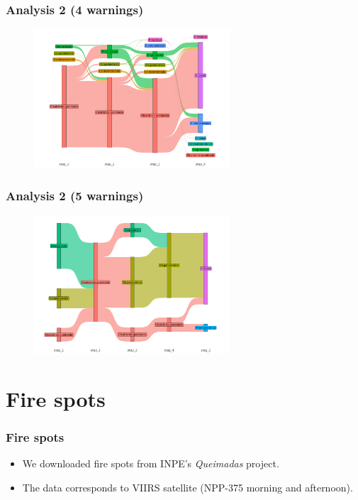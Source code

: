 \documentclass[aspectratio=169]{beamer}
\begin{document}
\begin{frame}
    \frametitle{Analysis 2 (4 warnings) }
    \begin{figure}[h] 
    \includegraphics[width=0.65\textwidth]{./figures/an2_plot_deter_prodes_subarea_trajectory_4.png}
    \end{figure}
\end{frame}

\begin{frame}
    \frametitle{Analysis 2 (5 warnings) }
    \begin{figure}[h] 
    \includegraphics[width=0.65\textwidth]{./figures/an2_plot_deter_prodes_subarea_trajectory_5.png}
    \end{figure}
\end{frame}



\section{Fire spots}

\begin{frame}
    \frametitle{Fire spots}
    \begin{itemize}
        \item We downloaded fire spots from INPE's \emph{Queimadas} project.
        \item The data corresponds to VIIRS satellite (NPP-375 morning and 
            afternoon).
    \end{itemize}
\end{frame}
\end{document}
